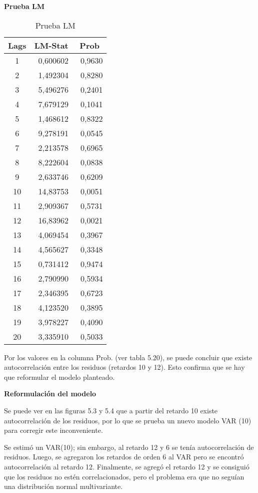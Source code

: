 \begin{enumerate}
\textbf{Prueba LM}

\begin{table}[H]
\centering
\begin{tabular}{ccc}\hline\hline
Lags & LM-Stat & Prob \\ \hline\hline
1 & ~0,600602 & ~0,9630 \\
2 & ~1,492304 & ~0,8280 \\
3 & ~5,496276 & ~0,2401 \\
4 & ~7,679129 & ~0,1041 \\
5 & ~1,468612 & ~0,8322 \\
6 & ~9,278191 & ~0,0545 \\
7 & ~2,213578 & ~0,6965 \\
8 & ~8,222604 & ~0,0838 \\
9 & ~2,633746 & ~0,6209 \\
10& ~14,83753 & ~0,0051 \\
11& ~2,909367 & ~0,5731 \\
12& ~16,83962 & ~0,0021 \\
13& ~4,069454 & ~0,3967 \\
14& ~4,565627 & ~0,3348 \\
15& ~0,731412 & ~0,9474 \\
16& ~2,790990 & ~0,5934 \\
17& ~2,346395 & ~0,6723 \\
18& ~4,123520 & ~0,3895 \\
19& ~3,978227 & ~0,4090 \\
20& ~3,335910 & ~0,5033 \\\hline\hline
\end{tabular}
\caption{Prueba LM}
\label{tab38}
\end{table}

Por los valores en la columna Prob. (ver tabla 5.20), se puede concluir que existe autocorrelaci\'{o}n entre los residuos (retardos 10 y 12). Esto confirma que se hay que reformular el modelo planteado.\newline

\textbf{Reformulaci\'{o}n del modelo}

Se puede ver en las figuras 5.3 y 5.4 que a partir del retardo 10 existe autocorrelaci\'{o}n de los residuos, por lo que se prueba un nuevo modelo VAR (10) para corregir este inconveniente.\newline

Se estim\'{o} un VAR(10); sin embargo, al retardo 12 y 6 se ten\'{i}a autocorrelaci\'{o}n de residuos. Luego, se agregaron los retardos de orden 6 al VAR pero se encontr\'{o} autocorrelaci\'{o}n al retardo 12. Finalmente, se agreg\'{o} el retardo 12 y se consigui\'{o} que los residuos no est\'{e}n correlacionados, pero el problema era que no segu\'{i}an una distribuci\'{o}n normal multivariante. \newline


\end{enumerate}
